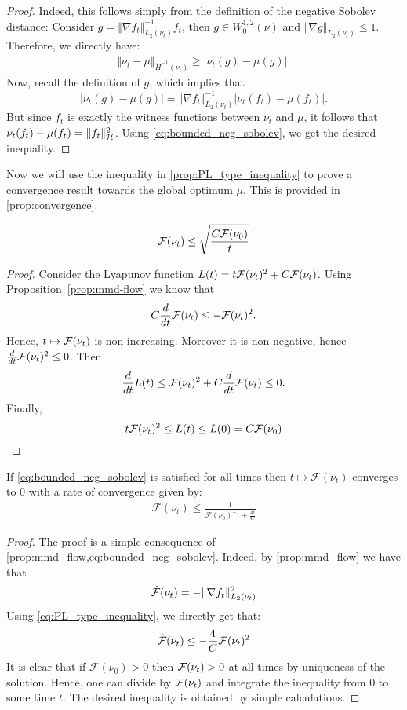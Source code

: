 \begin{proof}
	Indeed, this follows simply from the definition of the negative Sobolev distance: Consider $g = \Vert \nabla f_t\Vert^{-1}_{L_2(\nu_t)} f_t$, then $g\in W_0^{1,2}(\nu)$  and $\Vert \nabla g \Vert_{L_2(\nu_t)}\leq 1$. Therefore, we directly have:
	\begin{align}
		\Vert \nu_t - \mu\Vert_{\dot{H}^{-1}(\nu_t)}\geq \vert \nu_t(g) - \mu(g)  \vert.
	\end{align}
Now, recall the definition of $g$, which implies that
\[
\vert \nu_t(g) - \mu(g)  \vert = \Vert \nabla f_t\Vert^{-1}_{L_2(\nu_t)} \vert \nu_t(f_t)-\mu(f_t)\vert.
\]
But since $f_t$  is exactly the witness functions between $\nu_t$ and $\mu$, it follows that $\nu_t(f_t)-\mu(f_t) = \Vert f_t\Vert^2_{{{\mathcal H}}}$.
Using \cref{eq:bounded_neg_sobolev}, we get the desired inequality.
\end{proof}

Now we will use the inequality in \cref{prop:PL_type_inequality} to prove a convergence result towards the global optimum $\mu$. This is provided in \cref{prop:convergence}.
\begin{proposition}
$$
{{\mathcal F}}(\nu_t) \leq \sqrt{\frac{C{{\mathcal F}}(\nu_0)}{t}} 
$$
\end{proposition}
\begin{proof}
Consider the Lyapunov function $L(t) = t {{\mathcal F}}(\nu_t)^2 + C {{\mathcal F}}(\nu_t)$. Using Proposition~\ref{prop:mmd-flow} we know that $$C \frac{d}{dt} {{\mathcal F}}(\nu_t) \leq - {{\mathcal F}}(\nu_t)^2.$$
Hence, $t \mapsto {{\mathcal F}}(\nu_t)$ is non increasing. Moreover it is non negative, hence $\frac{d}{dt}{{\mathcal F}}(\nu_t)^2 \leq 0$. Then $$\frac{d}{dt}L(t) \leq {{\mathcal F}}(\nu_t)^2 + C \frac{d}{dt}{{\mathcal F}}(\nu_t) \leq 0.$$ 
Finally, $$t {{\mathcal F}}(\nu_t)^2 \leq L(t) \leq L(0) = C {{\mathcal F}}(\nu_0)$$
\end{proof}

\begin{proposition}\label{prop:convergence}
	If \cref{eq:bounded_neg_sobolev} is satisfied for all times then $t\mapsto \mathcal{F}(\nu_t)$ converges to $0$ with a rate of convergence given by:
	\begin{align}
		\mathcal{F}(\nu_t)\leq \frac{1}{\mathcal{F}(\nu_0)^{-1} + \frac{4t}{C}}
	\end{align}
\end{proposition}
\begin{proof}
	The proof is a simple consequence of \cref{prop:mmd_flow,eq:bounded_neg_sobolev}. Indeed, by \cref{prop:mmd_flow} we have that 
	\begin{align}
		\dot{{{\mathcal F}}}(\nu_t) = - \Vert \nabla f_t \Vert^2_{L_2(\nu_t)} 	
	\end{align}
	Using \cref{eq:PL_type_inequality}, we directly get that:
	\begin{align}
		\dot{{{\mathcal F}}}(\nu_t) \leq  -\frac{4}{C}{{\mathcal F}}(\nu_t)^2
	\end{align}
It is clear that if $\mathcal{F}(\nu_0)>0$ then ${{\mathcal F}}(\nu_t)>0$ at all times by uniqueness of the solution. Hence, one can divide by ${{\mathcal F}}(\nu_t)$ and integrate the inequality from $0$ to some time $t$. The desired inequality is obtained by simple calculations.
\end{proof}

